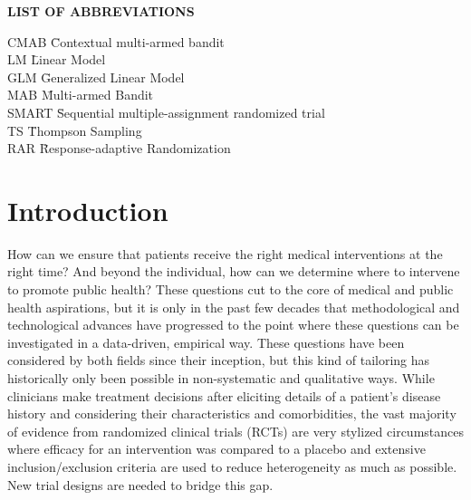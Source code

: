 \documentclass[12pt,,letterpaper,twoside]{report}
\begin{document}
\begin{center}
{\normalsize \textbf{LIST OF ABBREVIATIONS}}
\end{center}

\newcommand{\Ab}[2]{\noindent  #1 \> #2 \\}
\newcommand{\Abi}[2]{\noindent #1 \hspace{1.5cm} \= #2 \\}

\begin{tabbing}
\Abi{CMAB}{Contextual multi-armed bandit}\Abi{LM}{Linear
Model}\Abi{GLM}{Generalized Linear Model}\Abi{MAB}{Multi-armed
Bandit}\Abi{SMART}{Sequential multiple-assignment randomized
trial}\Abi{TS}{Thompson Sampling}\Abi{RAR}{Response-adaptive
Randomization}
\end{tabbing}

\clearpage



\hypertarget{introduction}{%
\section{Introduction}\label{introduction}}

How can we ensure that patients receive the right medical interventions
at the right time? And beyond the individual, how can we determine where
to intervene to promote public health? These questions cut to the core
of medical and public health aspirations, but it is only in the past few
decades that methodological and technological advances have progressed
to the point where these questions can be investigated in a data-driven,
empirical way. These questions have been considered by both fields since
their inception, but this kind of tailoring has historically only been
possible in non-systematic and qualitative ways. While clinicians make
treatment decisions after eliciting details of a patient's disease
history and considering their characteristics and comorbidities, the
vast majority of evidence from randomized clinical trials (RCTs) are
very stylized circumstances where efficacy for an intervention was
compared to a placebo and extensive inclusion/exclusion criteria are
used to reduce heterogeneity as much as possible. New trial designs are
needed to bridge this gap.
\end{document}
